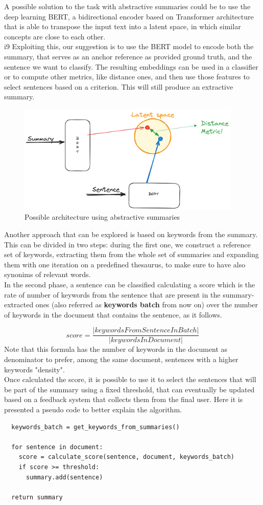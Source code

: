 A possible solution to the task with abstractive summaries could be to use the deep learning BERT, a bidirectional encoder based on Transformer architecture that is able to transpose the input text into a latent space, in which similar concepts are close to each other. \\i9
Exploiting this, our suggestion is to use the BERT model to encode both the summary, that serves as an anchor reference as provided ground truth, and the sentence we want to classify. The resulting embeddings can be used in a classifier or to compute other metrics, like distance ones, and then use those features to select sentences based on a criterion. This will still produce an extractive summary.
\begin{figure}[H]
  \centering
  \includegraphics[width=0.95\textwidth]{images/abstractive.png}
  \caption{Possible architecture using abstractive summaries}
  \label{fig:abstractive}
\end{figure} 

Another approach that can be explored is based on keywords from the summary. This can be divided in two steps: during the first one, we construct a reference set of keywords, extracting them from the whole set of summaries and expanding them with one iteration on a predefined thesaurus, to make sure to have also synonims of relevant words. \\
In the second phase, a sentence can be classified calculating a score which is the rate of number of keywords from the sentence that are present in the summary-extracted ones (also referred as \textbf{keywords batch} from now on) over the number of keywords in the document that contains the sentence, as it follows.

$$score = \frac{|keywordsFromSentenceInBatch|}{|keywordsInDocument|}$$
Note that this formula has the number of keywords in the document as denominator to prefer, among the same document, sentences with a higher keywords "density".\\
Once calculated the score, it is possible to use it to select the sentences that will be part of the summary using a fixed threshold, that can eventually be updated based on a feedback system that collects them from the final user. 
Here it is presented a pseudo code to better explain the algorithm.

\begin{lstlisting}
  keywords_batch = get_keywords_from_summaries()

  for sentence in document:
    score = calculate_score(sentence, document, keywords_batch)
    if score >= threshold:
      summary.add(sentence)
  
  return summary
  
\end{lstlisting}